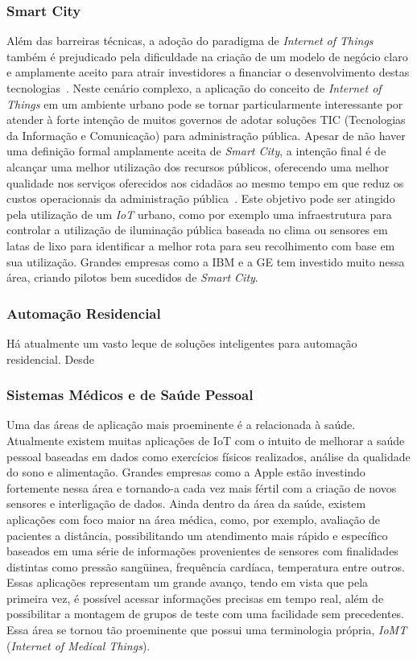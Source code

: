 \subsubsection{Smart City}
Além das barreiras técnicas, a adoção do paradigma de \textit{Internet of Things} também é prejudicado
pela dificuldade na criação de um modelo de negócio claro e amplamente aceito para atrair investidores
a financiar o desenvolvimento destas tecnologias~\cite{RePEc:zbw:itse13:88475}.
Neste cenário complexo, a aplicação do conceito de \textit{Internet of Things} em um ambiente urbano
pode se tornar particularmente interessante por atender à forte intenção de muitos governos de adotar
soluções TIC (Tecnologias da Informação e Comunicação) para administração pública.
Apesar de não haver uma definição formal amplamente aceita de \textit{Smart City}, a intenção final é de
alcançar uma melhor utilização dos recursos públicos, oferecendo uma melhor qualidade nos serviços oferecidos
aos cidadãos ao mesmo tempo em que reduz os custos operacionais da administração pública~\cite{IoTSmart2014}.
Este objetivo pode ser atingido pela utilização de um \textit{IoT} urbano, como por exemplo uma infraestrutura
para controlar a utilização de iluminação pública baseada no clima ou sensores em latas de lixo para
identificar a melhor rota para seu recolhimento com base em sua utilização. Grandes empresas como a
IBM e a GE tem investido muito nessa área, criando pilotos bem sucedidos de \textit{Smart City}.

\subsubsection{Automação Residencial}
Há atualmente um vasto leque de soluções inteligentes para automação residencial. Desde 

\subsubsection{Sistemas Médicos e de Saúde Pessoal}
Uma das áreas de aplicação mais proeminente é a relacionada à saúde. Atualmente existem muitas aplicações
de IoT com o intuito de melhorar a saúde pessoal baseadas em dados como exercícios físicos realizados,
análise da qualidade do sono e alimentação. Grandes empresas como a Apple estão investindo fortemente nessa
área e tornando-a cada vez mais fértil com a criação de novos sensores e interligação de dados.
Ainda dentro da área da saúde, existem aplicações com foco maior na área médica, como, por exemplo,
avaliação de pacientes a distância, possibilitando um atendimento mais rápido e específico baseados em uma
série de informações provenientes de sensores com finalidades distintas como pressão sangüinea,
frequência cardíaca, temperatura entre outros. Essas aplicações representam um grande avanço, tendo
em vista que pela primeira vez, é possível acessar informações precisas em tempo real, além de possibilitar
a montagem de grupos de teste com uma facilidade sem precedentes. Essa área se tornou tão proeminente que
possui uma terminologia própria, \textit{IoMT} (\textit{Internet of Medical Things}).


